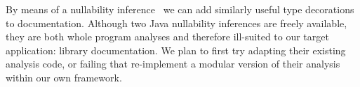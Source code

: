 By means of a nullability inference~\cite{NIT,NonNullTypeInference} we can add
similarly useful type decorations to documentation.  Although two Java
nullability inferences are freely available, they are both whole program
analyses and therefore ill-suited to our target application: library
documentation.  We plan to first try adapting their existing analysis code, or
failing that re-implement a modular version of their analysis within our own
framework.


